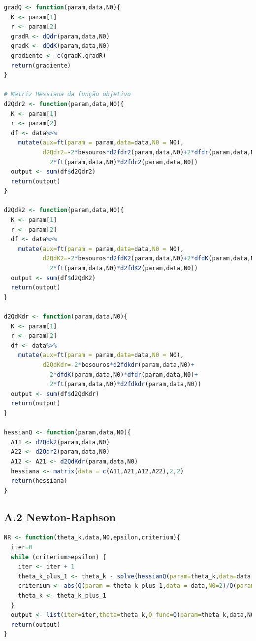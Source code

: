 \documentclass[a4paper,12pt,twoside]{article}
\begin{document}
\begin{lstlisting}[language=R]
gradQ <- function(param,data,N0){
  K <- param[1]
  r <- param[2]
  gradR <- dQdr(param,data,N0)
  gradK <- dQdK(param,data,N0)
  gradiente <- c(gradK,gradR)
  return(gradiente)
}

# Matriz Hessiana da função objetivo
d2Qdr2 <- function(param,data,N0){
  K <- param[1]
  r <- param[2]
  df <- data%>%
    mutate(aux=ft(param = param,data=data,N0 = N0),
           d2Qdr2=-2*besouros*d2fdr2(param,data,N0)+2*dfdr(param,data,N0)^2 +
             2*ft(param,data,N0)*d2fdr2(param,data,N0))
  output <- sum(df$d2Qdr2)
  return(output)
}

d2Qdk2 <- function(param,data,N0){
  K <- param[1]
  r <- param[2]
  df <- data%>%
    mutate(aux=ft(param = param,data=data,N0 = N0),
           d2QdK2=-2*besouros*d2fdK2(param,data,N0)+2*dfdK(param,data,N0)^2 +
             2*ft(param,data,N0)*d2fdK2(param,data,N0))
  output <- sum(df$d2QdK2)
  return(output)
}

d2QdKdr <- function(param,data,N0){
  K <- param[1]
  r <- param[2]
  df <- data%>%
    mutate(aux=ft(param = param,data=data,N0 = N0),
           d2QdKdr=-2*besouros*d2fdkdr(param,data,N0)+
             2*dfdK(param,data,N0)*dfdr(param,data,N0)+
             2*ft(param,data,N0)*d2fdkdr(param,data,N0))
  output <- sum(df$d2QdKdr)
  return(output)
}

hessianQ <- function(param,data,N0){
  A11 <- d2Qdk2(param,data,N0)
  A22 <- d2Qdr2(param,data,N0)
  A12 <- A21 <- d2QdKdr(param,data,N0)
  hessiana <- matrix(data = c(A11,A21,A12,A22),2,2)
  return(hessiana)
}

\end{lstlisting}
\newpage
\subsection*{A.2 Newton-Raphson}
\begin{lstlisting}[language=R]
NR <- function(theta_k,data,N0,epsilon,criterium){
  iter=0
  while (criterium>epsilon) {
    iter <- iter + 1
    theta_k_plus_1 <- theta_k - solve(hessianQ(param=theta_k,data=data,N0=2))%*%gradQ(param=theta_k,data=data,N0=2)
    criterium <- abs(Q(param = theta_k_plus_1,data = data,N0=2)/Q(param = theta_k,data = data,N0=2) - 1)
    theta_k <- theta_k_plus_1
  }
  output <- list(iter=iter,theta=theta_k,Q_func=Q(param=theta_k,data,N0))
  return(output)
}
\end{lstlisting}
\end{document}
